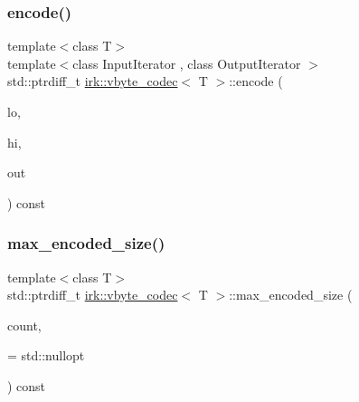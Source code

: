 \mbox{\label{structirk_1_1vbyte__codec_a8d8f0f48198257165cbfe17bb8e0a7f1}} 
\subsubsection{\texorpdfstring{encode()}{encode()}\hspace{0.1cm}{\footnotesize\ttfamily [2/2]}}
{\footnotesize\ttfamily template$<$class T$>$ \\
template$<$class Input\+Iterator , class Output\+Iterator $>$ \\
std\+::ptrdiff\+\_\+t \mbox{\hyperlink{structirk_1_1vbyte__codec}{irk\+::vbyte\+\_\+codec}}$<$ T $>$\+::encode (\begin{DoxyParamCaption}\item[{Input\+Iterator}]{lo,  }\item[{Input\+Iterator}]{hi,  }\item[{Output\+Iterator}]{out }\end{DoxyParamCaption}) const\hspace{0.3cm}{\ttfamily [inline]}}

\mbox{\label{structirk_1_1vbyte__codec_aaccf33b7ad6ed3b848550d18e9f4b4fd}} 
\subsubsection{\texorpdfstring{max\+\_\+encoded\+\_\+size()}{max\_encoded\_size()}}
{\footnotesize\ttfamily template$<$class T$>$ \\
std\+::ptrdiff\+\_\+t \mbox{\hyperlink{structirk_1_1vbyte__codec}{irk\+::vbyte\+\_\+codec}}$<$ T $>$\+::max\+\_\+encoded\+\_\+size (\begin{DoxyParamCaption}\item[{int}]{count,  }\item[{std\+::optional$<$ T $>$}]{ = {\ttfamily std\+:\+:nullopt} }\end{DoxyParamCaption}) const\hspace{0.3cm}{\ttfamily [inline]}}



